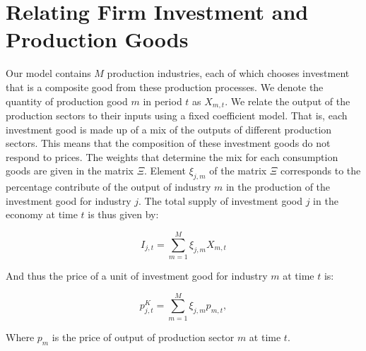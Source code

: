     \section{Relating Firm Investment and Production Goods}\label{sec:prod_invest_map}
    
    Our model contains $M$ production industries, each of which chooses investment that is a composite good from these production processes.  We denote the quantity of production good $m$ in period $t$ as $X_{m,t}$.  We relate the output of the production sectors to their inputs using a fixed coefficient model. That is, each investment good is made up of a mix of the outputs of different production sectors.  This means that the composition of these investment goods do not respond to prices.  The weights that determine the mix for each consumption goods are given in the matrix $\Xi$.  Element $\xi_{j,m}$ of the matrix $\Xi$ corresponds to the percentage contribute of the output of industry $m$ in the production of the investment good for industry $j$.  The total supply of investment good $j$ in the economy at time $t$ is thus given by: 
    
             \begin{equation} \label{eqn:mix_cons}
             I_{j,t} = \sum_{m=1}^{M}\xi_{j,m}X_{m,t} 
    	\end{equation}
	
	And thus the price of a unit of investment good for industry $m$ at time $t$ is:
	
             \begin{equation} \label{eqn:mix_cons_price}
             p^{K}_{j,t} = \sum_{m=1}^{M}\xi_{j,m}p_{m,t}, 
    	\end{equation}
    
    Where $p_{m}$ is the price of output of production sector $m$ at time $t$.



